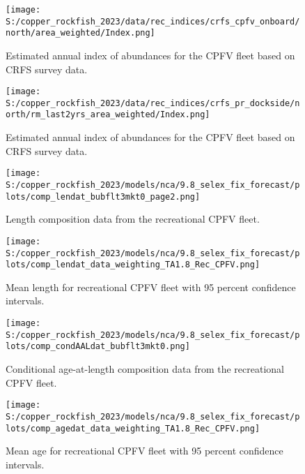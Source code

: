 \documentclass[11pt,
  english,
  letterpaper,
]{article}
\begin{document}
\pagebreak

\begin{figure}
\centering
\texttt{[image: S:/copper\_rockfish\_2023/data/rec\_indices/crfs\_cpfv\_onboard/north/area\_weighted/Index.png]}
\caption{Estimated annual index of abundances for the CPFV fleet based on CRFS survey data.\label{fig:crfs-index-main}}
\end{figure}

\pagebreak

\begin{figure}
\centering
\texttt{[image: S:/copper\_rockfish\_2023/data/rec\_indices/crfs\_pr\_dockside/north/rm\_last2yrs\_area\_weighted/Index.png]}
\caption{Estimated annual index of abundances for the CPFV fleet based on CRFS survey data.\label{fig:crfs-pr-index-main}}
\end{figure}

\pagebreak

\begin{figure}
\centering
\texttt{[image: S:/copper\_rockfish\_2023/models/nca/9.8\_selex\_fix\_forecast/plots/comp\_lendat\_bubflt3mkt0\_page2.png]}
\caption{Length composition data from the recreational CPFV fleet.\label{fig:rec-cpfv-len-data}}
\end{figure}

\pagebreak

\begin{figure}
\centering
\texttt{[image: S:/copper\_rockfish\_2023/models/nca/9.8\_selex\_fix\_forecast/plots/comp\_lendat\_data\_weighting\_TA1.8\_Rec\_CPFV.png]}
\caption{Mean length for recreational CPFV fleet with 95 percent confidence intervals.\label{fig:mean-rec-cpfv-len-data}}
\end{figure}

\pagebreak

\begin{figure}
\centering
\texttt{[image: S:/copper\_rockfish\_2023/models/nca/9.8\_selex\_fix\_forecast/plots/comp\_condAALdat\_bubflt3mkt0.png]}
\caption{Conditional age-at-length composition data from the recreational CPFV fleet.\label{fig:rec-cpfv-caal-data}}
\end{figure}

\pagebreak

\begin{figure}
\centering
\texttt{[image: S:/copper\_rockfish\_2023/models/nca/9.8\_selex\_fix\_forecast/plots/comp\_agedat\_data\_weighting\_TA1.8\_Rec\_CPFV.png]}
\caption{Mean age for recreational CPFV fleet with 95 percent confidence intervals.\label{fig:mean-rec-cpfv-age-data}}
\end{figure}
\end{document}
